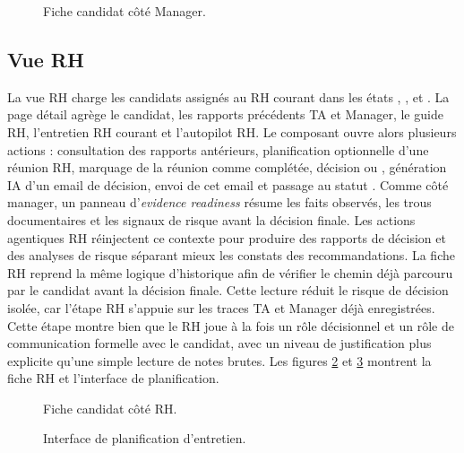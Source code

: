 \begin{figure}[H]
  \centering
  \caption{\label{fig:manager-candidate-review}Fiche candidat côté Manager.}
\end{figure}

\subsection{Vue RH}
La vue RH charge les candidats assignés au RH courant dans les états , ,  et . La page détail agrège le candidat, les rapports précédents TA et Manager, le guide RH, l'entretien RH courant et l'autopilot RH.
Le composant  ouvre alors plusieurs actions : consultation des rapports antérieurs, planification optionnelle d'une réunion RH, marquage de la réunion comme complétée, décision  ou , génération IA d'un email de décision, envoi de cet email et passage au statut .
Comme côté manager, un panneau d'\textit{evidence readiness} résume les faits observés, les trous documentaires et les signaux de risque avant la décision finale. Les actions agentiques RH réinjectent ce contexte pour produire des rapports de décision et des analyses de risque séparant mieux les constats des recommandations.
La fiche RH reprend la même logique d'historique afin de vérifier le chemin déjà parcouru par le candidat avant la décision finale. Cette lecture réduit le risque de décision isolée, car l'étape RH s'appuie sur les traces TA et Manager déjà enregistrées.
Cette étape montre bien que le RH joue à la fois un rôle décisionnel et un rôle de communication formelle avec le candidat, avec un niveau de justification plus explicite qu'une simple lecture de notes brutes. Les figures \ref{fig:hr-decision-page} et \ref{fig:interview-scheduling} montrent la fiche RH et l'interface de planification.

\begin{figure}[H]
  \centering
  \caption{\label{fig:hr-decision-page}Fiche candidat côté RH.}
\end{figure}

\begin{figure}[H]
  \centering
  \caption{\label{fig:interview-scheduling}Interface de planification d'entretien.}
\end{figure}

